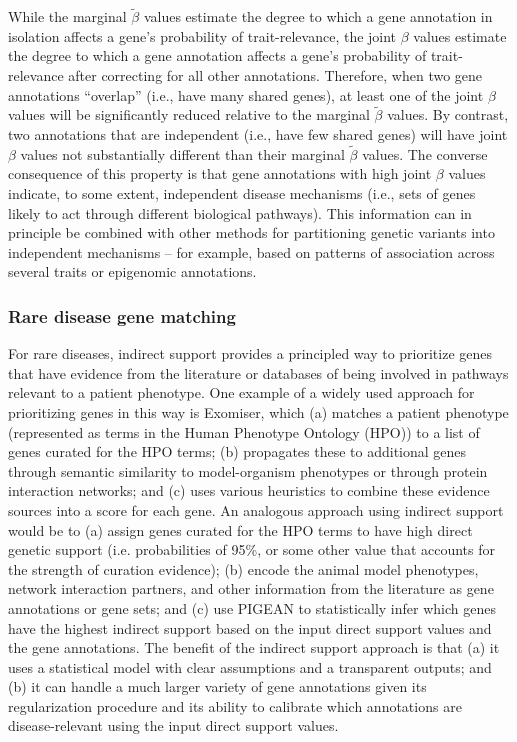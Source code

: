 While the marginal $\tilde{\beta}$ values estimate the degree to which
a gene annotation in isolation affects a gene's probability of
trait-relevance, the joint $\beta$ values estimate the degree to which
a gene annotation affects a gene's probability of trait-relevance
after correcting for all other annotations. Therefore, when two gene
annotations ``overlap'' (i.e., have many shared genes), at least one
of the joint $\beta$ values will be significantly reduced relative to
the marginal $\tilde{\beta}$ values. By contrast, two annotations that
are independent (i.e., have few shared genes) will have joint $\beta$
values not substantially different than their marginal $\tilde{\beta}$
values. The converse consequence of this property is that gene
annotations with high joint $\beta$ values indicate, to some extent,
independent disease mechanisms (i.e., sets of genes likely
to act through different biological pathways). This information can in
principle be combined with other methods for partitioning genetic
variants into independent mechanisms -- for example, based on patterns
of association across several traits\cite{udler} or epigenomic annotations\cite{price}.

\subsubsection{Rare disease gene matching}
For rare diseases, indirect support provides a principled way to
prioritize genes that have evidence from the literature or databases
of being involved in pathways relevant to a patient phenotype. One
example of a widely used approach for prioritizing genes in this way
is Exomiser, which (a) matches a patient phenotype (represented as
terms in the Human Phenotype Ontology (HPO)) to a list of genes curated
for the HPO terms; (b) propagates these to additional genes through
semantic similarity to model-organism phenotypes or through protein
interaction networks; and (c) uses various heuristics to combine these
evidence sources into a score for each gene. An analogous approach
using indirect support would be to (a) assign genes curated for the
HPO terms to have high direct genetic support (i.e. probabilities of
95\%, or some other value that accounts for the strength of curation
evidence); (b) encode the animal model phenotypes, network interaction
partners, and other information from the literature as gene
annotations or gene sets; and (c) use PIGEAN to statistically infer
which genes have the highest indirect support based on the input
direct support values and the gene annotations. The benefit of the
indirect support approach is that (a) it uses a statistical model with
clear assumptions and a transparent outputs; and (b) it can handle a
much larger variety of gene annotations given its regularization
procedure and its ability to calibrate which annotations are
disease-relevant using the input direct support values.


